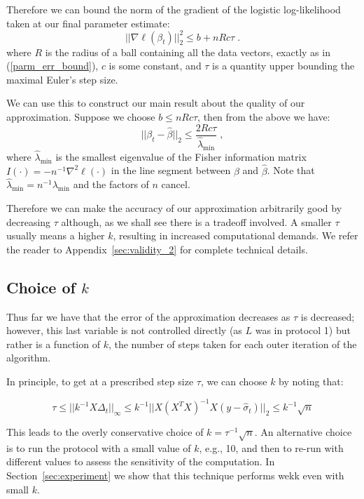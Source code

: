 \documentclass[11pt]{article}
\begin{document}
Therefore we can bound the norm of the gradient of the logistic log-likelihood taken at our final parameter estimate:
$$||\nabla\ell(\beta_t)||_2^2 \leq b + nRc\tau \; .$$
where $R$ is the radius of a ball containing all the data vectors, exactly as in (\ref{parm_err_bound}), $c$ is some constant, and $\tau$ is a quantity upper bounding the maximal Euler's step size.

We can use this to construct our main result about the quality of our approximation.  Suppose we choose $b\leq nRc\tau$, then from the above we have:
\begin{equation}\label{eq:error_2}
||\beta_t-\hat\beta||_2 \leq \frac{2Rc\tau}{\hat{\lambda}_{\text{min}}} \; ,
\end{equation}
where $\hat{\lambda}_{\text{min}}$ is the smallest eigenvalue of the Fisher information matrix $I(\cdot) = -n^{-1}\nabla^2\ell(\cdot)$ in the line segment between $\beta$ and $\hat\beta$.  Note that $\hat{\lambda}_{\text{min}} = n^{-1}\lambda_{\text{min}}$ and  the factors of $n$ cancel.

Therefore we can make the accuracy of our approximation arbitrarily good by decreasing $\tau$ although, as we shall see there is a tradeoff involved.  A smaller $\tau$ usually means a higher $k$, resulting in increased computational demands. We refer the reader to Appendix~\ref{sec:validity_2} for complete technical details.

\subsection{Choice of $k$}
Thus far we have that the error of the approximation decreases as $\tau$ is decreased; however, this last variable is not controlled directly (as $L$ was in protocol 1) but rather is a function of $k$, the number of steps taken for each outer iteration of the algorithm.

In principle, to get at a prescribed step size $\tau$, we can choose $k$ by noting that:

\begin{equation}\label{eq_choose_k}\tau \leq ||k^{-1}X\Delta_t||_\infty \leq k^{-1} ||X(X^TX)^{-1}X(y-\hat{\sigma}_t)||_2 \leq k^{-1}\sqrt{n}\end{equation}

This leads to the overly conservative choice of $k=\tau^{-1}\sqrt{n}$.  An alternative choice is to run the protocol with a small value of $k$, e.g., 10, and then to re-run with different values to assess the sensitivity of the computation.  In Section~\ref{sec:experiment} we show that this technique performs wekk even with small $k$.
\end{document}

